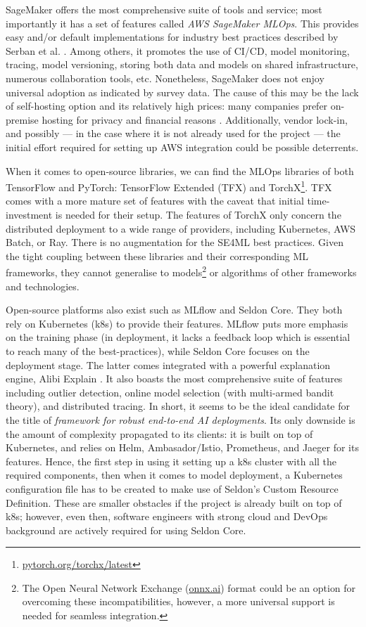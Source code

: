 SageMaker offers the most comprehensive suite of tools and service; most importantly it has a set of features called \textit{AWS SageMaker MLOps}. This provides easy and/or default implementations for industry best practices described by Serban et al. \cite{serban2020adoption,serban2021practices}. Among others, it promotes the use of CI/CD, model monitoring, tracing, model versioning, storing both data and models on shared infrastructure, numerous collaboration tools, etc. Nonetheless, SageMaker does not enjoy universal adoption as indicated by survey data. The cause of this may be the lack of self-hosting option and its relatively high prices: many companies prefer on-premise hosting for privacy and financial reasons \cite{bosch2021engineering}. Additionally, vendor lock-in, and possibly --- in the case where it is not already used for the project --- the initial effort required for setting up AWS integration could be possible deterrents.

When it comes to open-source libraries, we can find the MLOps libraries of both TensorFlow and PyTorch: TensorFlow Extended (TFX) \cite{baylor2017tfx} and TorchX\footnote{\href{https://pytorch.org/torchx/latest/}{pytorch.org/torchx/latest}}. TFX comes with a more mature set of features with the caveat that initial time-investment is needed for their setup. The features of TorchX only concern the distributed deployment to a wide range of providers, including Kubernetes, AWS Batch, or Ray. There is no augmentation for the SE4ML best practices. Given the tight coupling between these libraries and their corresponding ML frameworks, they cannot generalise to models\footnote{The Open Neural Network Exchange (\href{https://onnx.ai/}{onnx.ai}) format could be an option for overcoming these incompatibilities, however, a more universal support is needed for seamless integration.} or algorithms of other frameworks and technologies. 

Open-source platforms also exist such as MLflow and Seldon Core. They both rely on Kubernetes (k8s) to provide their features. MLflow puts more emphasis on the training phase (in deployment, it lacks a feedback loop which is essential to reach many of the best-practices), while Seldon Core focuses on the deployment stage. The latter comes integrated with a powerful explanation engine, Alibi Explain \cite{klaise2021alibi}. It also boasts the most comprehensive suite of features including outlier detection, online model selection (with multi-armed bandit theory), and distributed tracing. In short, it seems to be the ideal candidate for the title of \textit{framework for robust end-to-end AI deployments}. Its only downside is the amount of complexity propagated to its clients: it is built on top of Kubernetes, and relies on Helm, Ambasador/Istio, Prometheus, and Jaeger for its features. Hence, the first step in using it setting up a k8s cluster with all the required components, then when it comes to model deployment, a Kubernetes configuration file has to be created to make use of Seldon's Custom Resource Definition. These are smaller obstacles if the project is already built on top of k8s; however, even then, software engineers with strong cloud and DevOps background are actively required for using Seldon Core.

